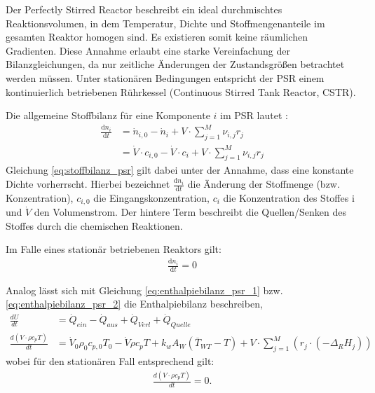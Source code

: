             Der Perfectly Stirred Reactor beschreibt ein ideal durchmischtes Reaktionsvolumen, in dem Temperatur, Dichte und Stoffmengenanteile im gesamten Reaktor homogen sind. Es existieren somit keine räumlichen Gradienten. Diese Annahme erlaubt eine starke Vereinfachung der Bilanzgleichungen, da nur zeitliche Änderungen der Zustandsgrößen betrachtet werden müssen. Unter stationären Bedingungen entspricht der PSR einem kontinuierlich betriebenen Rührkessel (Continuous Stirred Tank Reactor, CSTR). 

            Die allgemeine Stoffbilanz für eine Komponente $i$ im PSR lautet \cite{Emig_Klemm_2017}:
            \begin{align}
                \frac{\mathrm{d}n_i}{\mathrm{d}t} &= \dot n_{i,0} - \dot n_i + V \cdot \sum_{j=1}^M \nu_{i,j}r_j\\
                &=\dot V\cdot c_{i,0} - \dot V\cdot c_i + V \cdot \sum_{j=1}^M \nu_{i,j}r_j \label{eq:stoffbilanz_psr}
            \end{align}
            Gleichung \ref{eq:stoffbilanz_psr} gilt dabei unter der Annahme, dass eine konstante Dichte vorherrscht. 
            Hierbei bezeichnet $\frac{\mathrm{d}n_i}{\mathrm{d}t}$ die Änderung der Stoffmenge (bzw. Konzentration), $c_{i,0}$ die Eingangskonzentration, $c_i$ die Konzentration des Stoffes i und $\dot V$ den Volumenstrom. Der hintere Term beschreibt die Quellen/Senken des Stoffes durch die chemischen Reaktionen. 
            
            Im Falle eines stationär betriebenen Reaktors gilt:
            \begin{align}
                \frac{\mathrm{d}n_i}{\mathrm{d}t} = 0
            \end{align}

            Analog lässt sich mit Gleichung \ref{eq:enthalpiebilanz_psr_1} bzw. \ref{eq:enthalpiebilanz_psr_2} die Enthalpiebilanz beschreiben,
            \begin{align}
                \frac{dU}{dt}&=\dot Q_{ein} - \dot Q_{aus} + \dot{Q}_{Verl} + \dot Q_{Quelle} \label{eq:enthalpiebilanz_psr_1}
                \\
                \frac{d\left(V \cdot \rho c_p T\right)}{dt} 
                &= \dot{V}_0 \rho_0 c_{p,0} T_0 
                - \dot{V} \rho c_p T 
                + k_w A_W (\overline{T}_{WT} - T) 
                + V \cdot \sum_{j=1}^{M} \left( r_j \cdot (-\Delta_R H_j) \right) \label{eq:enthalpiebilanz_psr_2}
            \end{align}
            wobei für den stationären Fall entsprechend gilt: 
            \begin{align}
                \frac{d\left(V \cdot \rho c_p T\right)}{dt}  = 0.
            \end{align}

